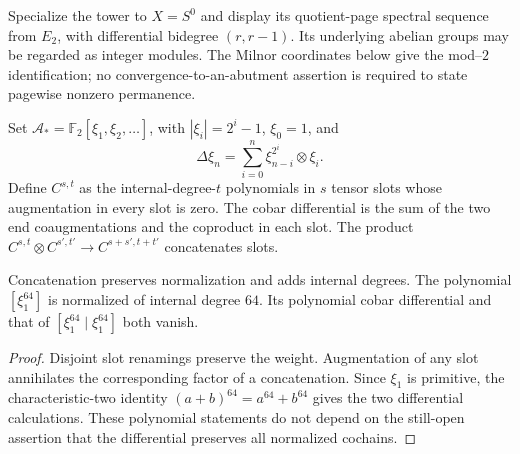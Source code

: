 \begin{definition}
  \label{def:h6-constructed-sphere-sequence}
  \notready
  Specialize the tower to $X=S^0$ and display its quotient-page spectral
  sequence from $E_2$, with differential bidegree $(r,r-1)$.
  Its underlying abelian groups may be regarded as integer modules.
  The Milnor coordinates below give the mod--$2$ identification; no
  convergence-to-an-abutment assertion is required to state pagewise
  nonzero permanence.
\end{definition}

\begin{definition}
  \label{def:h6-milnor-cobar}
  \notready
  Set $\mathcal A_*=\mathbb F_2[\xi_1,\xi_2,\ldots]$, with
  $|\xi_i|=2^i-1$, $\xi_0=1$, and
  \[
    \Delta\xi_n=\sum_{i=0}^n\xi_{n-i}^{2^i}\otimes\xi_i.
  \]
  Define $C^{s,t}$ as the internal-degree-$t$ polynomials in $s$ tensor
  slots whose augmentation in every slot is zero.  The cobar differential
  is the sum of the two end coaugmentations and the coproduct in each slot.
  The product $C^{s,t}\otimes C^{s',t'}\to C^{s+s',t+t'}$ concatenates slots.
\end{definition}

\begin{proposition}
  \label{prop:h6-polynomial-cocycles}
  \leanok
  Concatenation preserves normalization and adds internal degrees.
  The polynomial $[\xi_1^{64}]$ is normalized of internal degree $64$.
  Its polynomial cobar differential and that of
  $[\xi_1^{64}\mid\xi_1^{64}]$ both vanish.
\end{proposition}
\begin{proof}
  Disjoint slot renamings preserve the weight. Augmentation of any slot
  annihilates the corresponding factor of a concatenation. Since
  $\xi_1$ is primitive, the characteristic-two identity
  $(a+b)^{64}=a^{64}+b^{64}$ gives the two differential calculations.
  These polynomial statements do not depend on the still-open assertion
  that the differential preserves all normalized cochains.
  \leanok
\end{proof}

